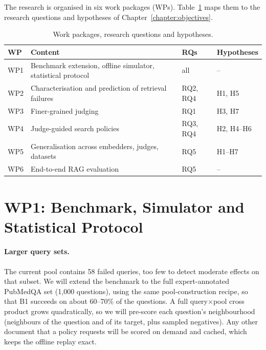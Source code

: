 
The research is organised in six work packages (WPs). Table~\ref{tab:wp-map} maps them to the research questions and hypotheses of Chapter~\ref{chapter:objectives}.

\begin{table}[htbp]
\centering
\caption{Work packages, research questions and hypotheses.}
\label{tab:wp-map}
\small
\begin{tabularx}{\textwidth}{lXll}
\toprule
WP & Content & RQs & Hypotheses \\
\midrule
WP1 & Benchmark extension, offline simulator, statistical protocol & all & -- \\
WP2 & Characterisation and prediction of retrieval failures & RQ2, RQ4 & H1, H5 \\
WP3 & Finer-grained judging & RQ1 & H3, H7 \\
WP4 & Judge-guided search policies & RQ3, RQ4 & H2, H4--H6 \\
WP5 & Generalisation across embedders, judges, datasets & RQ5 & H1--H7 \\
WP6 & End-to-end RAG evaluation & RQ5 & -- \\
\bottomrule
\end{tabularx}
\end{table}

\section{WP1: Benchmark, Simulator and Statistical Protocol}

\paragraph{Larger query sets.}
The current pool contains 58 failed queries, too few to detect moderate effects on that subset. We will extend the benchmark to the full expert-annotated PubMedQA set (1,000 questions), using the same pool-construction recipe, so that B1 succeeds on about 60--70\% of the questions. A full query$\times$pool cross product grows quadratically, so we will pre-score each question's neighbourhood (neighbours of the question and of its target, plus sampled negatives). Any other document that a policy requests will be scored on demand and cached, which keeps the offline replay exact.

